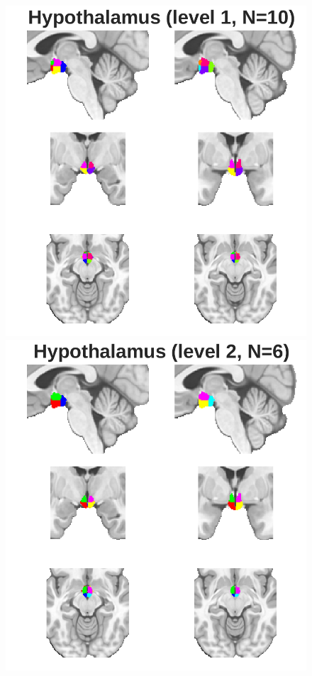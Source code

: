 \documentclass[10pt,letterpaper]{article}
\begin{document}
\begin{figure}[t]
\centering
\begin{minipage}{0.33\linewidth}
\includegraphics[width=\linewidth]{images/ht_fine.png}
\end{minipage}\hfill
\begin{minipage}{0.33\linewidth}
\includegraphics[width=\linewidth]{images/ht_coarse.png}

\end{minipage}
\end{figure}
\end{document}
